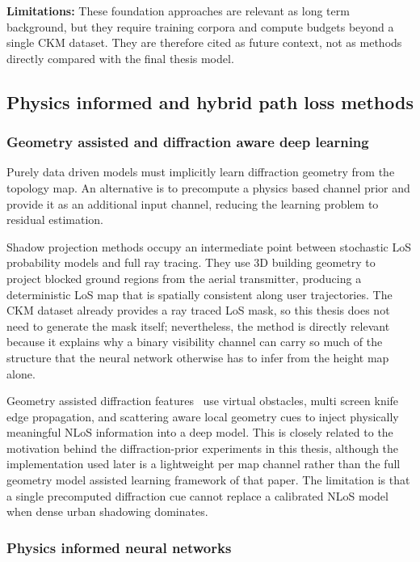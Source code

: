 \textbf{Limitations:} These foundation approaches are relevant as long term
background, but they require training corpora and compute budgets beyond a
single CKM dataset. They are therefore cited as future context, not as methods
directly compared with the final thesis model.

\subsection{Physics informed and hybrid path loss methods}
\label{sec:soa_physics}

\subsubsection{Geometry assisted and diffraction aware deep learning}

Purely data driven models must implicitly learn diffraction geometry from the
topology map.  An alternative is to precompute a physics based channel prior and
provide it as an additional input channel, reducing the learning problem to
residual estimation.

Shadow projection methods \cite{vinogradov2026shadow,vinogradov2026upsim} occupy an intermediate
point between stochastic LoS probability models and full ray tracing. They use
3D building geometry to project blocked ground regions from the aerial
transmitter, producing a deterministic LoS map that is spatially consistent
along user trajectories. The CKM dataset already provides a ray traced LoS
mask, so this thesis does not need to generate the mask itself; nevertheless,
the method is directly relevant because it explains why a binary visibility
channel can carry so much of the structure that the neural network otherwise
has to infer from the height map alone.

Geometry assisted diffraction features~\cite{geomDL2024} use virtual obstacles,
multi screen knife edge propagation, and scattering aware local geometry cues to
inject physically meaningful NLoS information into a deep model.  This is
closely related to the motivation behind the diffraction-prior experiments in
this thesis, although the implementation used later is a lightweight per map
channel rather than the full geometry model assisted learning framework of that
paper. The limitation is that a single precomputed diffraction cue cannot
replace a calibrated NLoS model when dense urban shadowing dominates.

\subsubsection{Physics informed neural networks}

